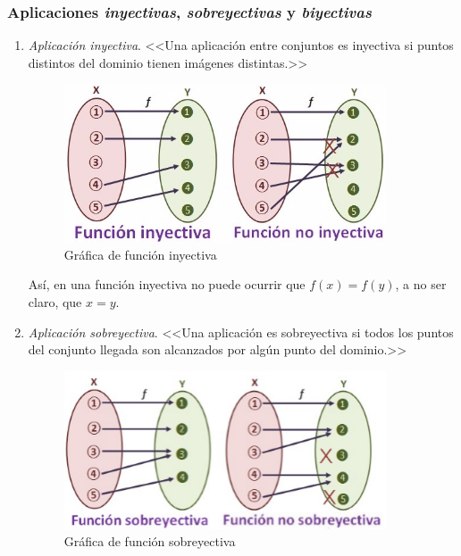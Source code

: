 \documentclass[11pt, oneside, titlepage]{article}
\begin{document}
\subsubsection{Aplicaciones \emph{inyectivas}, \emph{sobreyectivas} y \emph{biyectivas}}
\begin{enumerate}
\item \emph{Aplicación inyectiva}. <<Una aplicación entre conjuntos es inyectiva si puntos distintos del dominio tienen imágenes distintas.>>
\begin{figure}[htp]
\centering
\includegraphics[width=0.9\textwidth]{recursos/finyectiva.png}
\caption{Gráfica de función inyectiva}
\label{}
\end{figure}

Así, en una función inyectiva no puede ocurrir que $f(x) = f(y)$, a no ser claro, que $x = y$.
\item \emph{Aplicación sobreyectiva}. <<Una aplicación es sobreyectiva si todos los puntos del conjunto llegada son alcanzados por algún punto del dominio.>>
\begin{figure}[htp]
\centering
\includegraphics[width=0.9\textwidth]{recursos/fsobreyectiva.png}
\caption{Gráfica de función sobreyectiva}
\label{}
\end{figure}


\end{enumerate}
\end{document}

